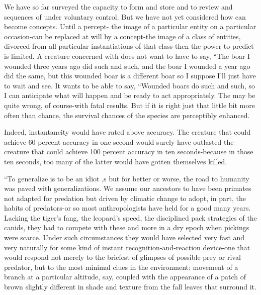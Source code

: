 We have so far surveyed the capacity to form and store 
and to review  and sequences of  under voluntary
control. But we have not yet considered how  can become concepts. Until a percept- the image of a particular entity on a par\-ticular occasion-can be replaced at will by a concept-the image of a class of entities, divorced from all particular instantiations of that class-then the power to predict is limited. A creature concerned with  does not want to have to say, ``The boar I wounded three years ago did such and such, and the boar I wounded a year ago did the same, but this wounded boar is a different boar so I suppose I'll just have to wait and see. It wants to be able to say, ``Wounded boars do such and such, so I can anticipate what will happen and be ready to act appropriately. The  may be quite wrong, of course-with fatal results. But if it is right just that little bit more often than chance, the survival chances of the species are perceptibly enhanced.

Indeed, instantaneity would have rated above accuracy. The creature that could achieve 60 percent accuracy in one second would surely have outlasted the creature that could achieve 100 percent accuracy in ten seconds-because in those ten seconds, too many of the latter would have gotten themselves killed.

``To generalize is to be an idiot \citep{Blake1808},s but for better or worse, the road to humanity was paved with generalizations. We assume our ancestors to have been primates not adapted for predation but driven by climatic change to adopt, in part, the habits of preda\-tors-or so most anthropologists have held for a good many years. Lacking the tiger's fang, the leopard's speed, the disciplined pack strategies of the canids, they had to compete with these and more in a dry epoch when pickings were scarce. Under such circumstances they would have selected very fast and very naturally for some kind of instant recognition-and-reaction device-one that would respond not merely to the briefest of glimpses of possible prey or rival predator, but to the most minimal clues in the environment: movement of a branch at a particular altitude, say, coupled with the appearance of a patch of brown slightly different in shade and texture from the fall leaves that surround it.


